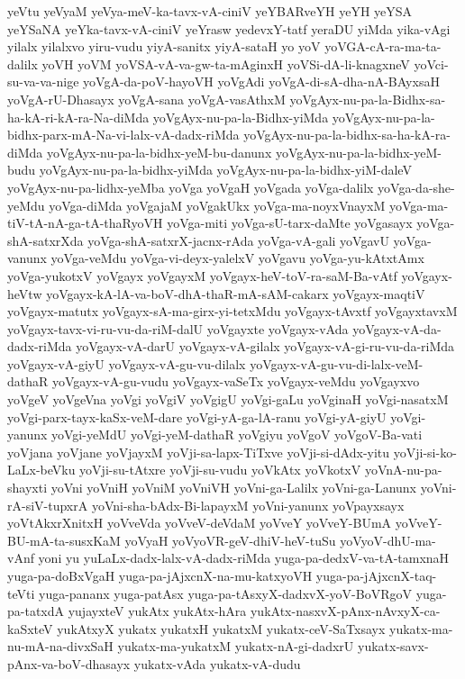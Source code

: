 {yeVtu
yeVyaM
yeVya-meV-ka-tavx-vA-ciniV
yeYBARveYH
yeYH
yeYSA
yeYSaNA
yeYka-tavx-vA-ciniV
yeYrasw
yedevxY-tatf
yeraDU
yiMda
yika-vAgi
yilalx
yilalxvo
yiru-vudu
yiyA-sanitx
yiyA-sataH
yo
yoV
yoVGA-cA-ra-ma-ta-dalilx
yoVH
yoVM
yoVSA-vA-va-gw-ta-mAginxH
yoVSi-dA-li-knagxneV
yoVci-su-va-va-nige
yoVgA-da-poV-hayoVH
yoVgAdi
yoVgA-di-sA-dha-nA-BAyxsaH
yoVgA-rU-Dhasayx
yoVgA-sana
yoVgA-vasAthxM
yoVgAyx-nu-pa-la-Bidhx-sa-ha-kA-ri-kA-ra-Na-diMda
yoVgAyx-nu-pa-la-Bidhx-yiMda
yoVgAyx-nu-pa-la-bidhx-parx-mA-Na-vi-lalx-vA-dadx-riMda
yoVgAyx-nu-pa-la-bidhx-sa-ha-kA-ra-diMda
yoVgAyx-nu-pa-la-bidhx-yeM-bu-danunx
yoVgAyx-nu-pa-la-bidhx-yeM-budu
yoVgAyx-nu-pa-la-bidhx-yiMda
yoVgAyx-nu-pa-la-bidhx-yiM-daleV
yoVgAyx-nu-pa-lidhx-yeMba
yoVga
yoVgaH
yoVgada
yoVga-dalilx
yoVga-da-she-yeMdu
yoVga-diMda
yoVgajaM
yoVgakUkx
yoVga-ma-noyxVnayxM
yoVga-ma-tiV-tA-nA-ga-tA-thaRyoVH
yoVga-miti
yoVga-sU-tarx-daMte
yoVgasayx
yoVga-shA-satxrXda
yoVga-shA-satxrX-jacnx-rAda
yoVga-vA-gali
yoVgavU
yoVga-vanunx
yoVga-veMdu
yoVga-vi-deyx-yalelxV
yoVgavu
yoVga-yu-kAtxtAmx
yoVga-yukotxV
yoVgayx
yoVgayxM
yoVgayx-heV-toV-ra-saM-Ba-vAtf
yoVgayx-heVtw
yoVgayx-kA-lA-va-boV-dhA-thaR-mA-sAM-cakarx
yoVgayx-maqtiV
yoVgayx-matutx
yoVgayx-sA-ma-girx-yi-tetxMdu
yoVgayx-tAvxtf
yoVgayxtavxM
yoVgayx-tavx-vi-ru-vu-da-riM-dalU
yoVgayxte
yoVgayx-vAda
yoVgayx-vA-da-dadx-riMda
yoVgayx-vA-darU
yoVgayx-vA-gilalx
yoVgayx-vA-gi-ru-vu-da-riMda
yoVgayx-vA-giyU
yoVgayx-vA-gu-vu-dilalx
yoVgayx-vA-gu-vu-di-lalx-veM-dathaR
yoVgayx-vA-gu-vudu
yoVgayx-vaSeTx
yoVgayx-veMdu
yoVgayxvo
yoVgeV
yoVgeVna
yoVgi
yoVgiV
yoVgigU
yoVgi-gaLu
yoVginaH
yoVgi-nasatxM
yoVgi-parx-tayx-kaSx-veM-dare
yoVgi-yA-ga-lA-ranu
yoVgi-yA-giyU
yoVgi-yanunx
yoVgi-yeMdU
yoVgi-yeM-dathaR
yoVgiyu
yoVgoV
yoVgoV-Ba-vati
yoVjana
yoVjane
yoVjayxM
yoVji-sa-lapx-TiTxve
yoVji-si-dAdx-yitu
yoVji-si-ko-LaLx-beVku
yoVji-su-tAtxre
yoVji-su-vudu
yoVkAtx
yoVkotxV
yoVnA-nu-pa-shayxti
yoVni
yoVniH
yoVniM
yoVniVH
yoVni-ga-Lalilx
yoVni-ga-Lanunx
yoVni-rA-siV-tupxrA
yoVni-sha-bAdx-Bi-lapayxM
yoVni-yanunx
yoVpayxsayx
yoVtAkxrXnitxH
yoVveVda
yoVveV-deVdaM
yoVveY
yoVveY-BUmA
yoVveY-BU-mA-ta-susxKaM
yoVyaH
yoVyoVR-geV-dhiV-heV-tuSu
yoVyoV-dhU-ma-vAnf
yoni
yu
yuLaLx-dadx-lalx-vA-dadx-riMda
yuga-pa-dedxV-va-tA-tamxnaH
yuga-pa-doBxVgaH
yuga-pa-jAjxcnX-na-mu-katxyoVH
yuga-pa-jAjxcnX-taq-teVti
yuga-pananx
yuga-patAsx
yuga-pa-tAsxyX-dadxvX-yoV-BoVRgoV
yuga-pa-tatxdA
yujayxteV
yukAtx
yukAtx-hAra
yukAtx-nasxvX-pAnx-nAvxyX-ca-kaSxteV
yukAtxyX
yukatx
yukatxH
yukatxM
yukatx-ceV-SaTxsayx
yukatx-ma-nu-mA-na-divxSaH
yukatx-ma-yukatxM
yukatx-nA-gi-dadxrU
yukatx-savx-pAnx-va-boV-dhasayx
yukatx-vAda
yukatx-vA-dudu
}
